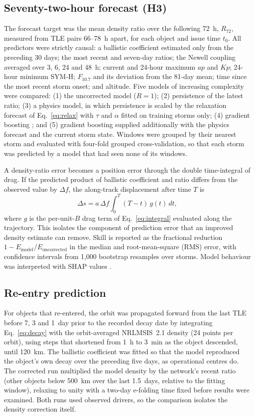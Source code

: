 \documentclass[11pt]{article}
\newcommand{\Kp}{\mathit{Kp}}
\newcommand{\ap}{\mathit{ap}}
\begin{document}
\subsection{Seventy-two-hour forecast (H3)}
The forecast target was the mean density ratio over the following 72~h, $R_{72}$, measured from TLE pairs 66--78~h apart, for each object and issue time $t_0$. All predictors were strictly causal: a ballistic coefficient estimated only from the preceding 30 days; the most recent and seven-day ratios; the Newell coupling averaged over 3, 6, 24 and 48~h; current and 24-hour maximum $\ap$ and $\Kp$; 24-hour minimum SYM-H; $F_{10.7}$ and its deviation from the 81-day mean; time since the most recent storm onset; and altitude. Five models of increasing complexity were compared: (1) the uncorrected model ($R = 1$); (2) persistence of the latest ratio; (3) a physics model, in which persistence is scaled by the relaxation forecast of Eq.~\eqref{eq:relax} with $\tau$ and $\alpha$ fitted on training storms only; (4) gradient boosting \citep[XGBoost;][]{chen2016}; and (5) gradient boosting supplied additionally with the physics forecast and the current storm state. Windows were grouped by their nearest storm and evaluated with four-fold grouped cross-validation, so that each storm was predicted by a model that had seen none of its windows.

A density-ratio error becomes a position error through the double time-integral of drag. If the predicted product of ballistic coefficient and ratio differs from the observed value by $\Delta f$, the along-track displacement after time $T$ is
\begin{equation}
\Delta s = a\, \Delta f \int_{0}^{T} (T - t)\, g(t)\, dt,
\label{eq:alongtrack}
\end{equation}
where $g$ is the per-unit-$B$ drag term of Eq.~\eqref{eq:integral} evaluated along the trajectory. This isolates the component of prediction error that an improved density estimate can remove. Skill is reported as the fractional reduction $1 - E_{\mathrm{model}}/E_{\mathrm{uncorrected}}$ in the median and root-mean-square (RMS) error, with confidence intervals from 1,000 bootstrap resamples over storms. Model behaviour was interpreted with SHAP values \citep{lundberg2017}.

\subsection{Re-entry prediction}
For objects that re-entered, the orbit was propagated forward from the last TLE before 7, 3 and 1~day prior to the recorded decay date by integrating Eq.~\eqref{eq:decay} with the orbit-averaged NRLMSIS~2.1 density (24 points per orbit), using steps that shortened from 1~h to 3~min as the object descended, until 120~km. The ballistic coefficient was fitted so that the model reproduced the object's own decay over the preceding five days, as operational centres do. The corrected run multiplied the model density by the network's recent ratio (other objects below 500~km over the last 1.5~days, relative to the fitting window), relaxing to unity with a two-day e-folding time fixed before results were examined. Both runs used observed drivers, so the comparison isolates the density correction itself.
\end{document}

